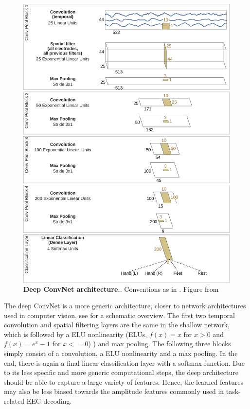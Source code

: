 \begin{figure}[h!tb]
    \myfloatalign
    \includegraphics[width=0.8\linewidth]{images/3D_Diagram_MatplotLib.ipynb.1.png}
    \caption[Deep ConvNet architecture]{
    \textbf{Deep ConvNet architecture.}. Conventions as in . Figure from \citet{schirrmeisterdeephbm2017}}\label{deep-net-figure}
\end{figure}

    The deep ConvNet is a more generic architecture, closer to network
architectures used in computer vision, see
 for a schematic overview. The first
two temporal convolution and spatial filtering layers are the same in
the shallow network, which is followed by a ELU nonlinearity (ELUs, $f(x)=x$ for $x > 0$ and $f(x) = e^x-1$ for $x <= 0$) \cite{clevert_fast_2016}) and max pooling. The following
three blocks simply consist of a convolution, a ELU nonlinearity and a
max pooling. In the end, there is again a final linear classification
layer with a softmax function. Due to its less specific and more generic
computational steps, the deep architecture should be able to capture a
large variety of features. Hence, the learned features may also be less
biased towards the amplitude features commonly used in task-related EEG
decoding.


